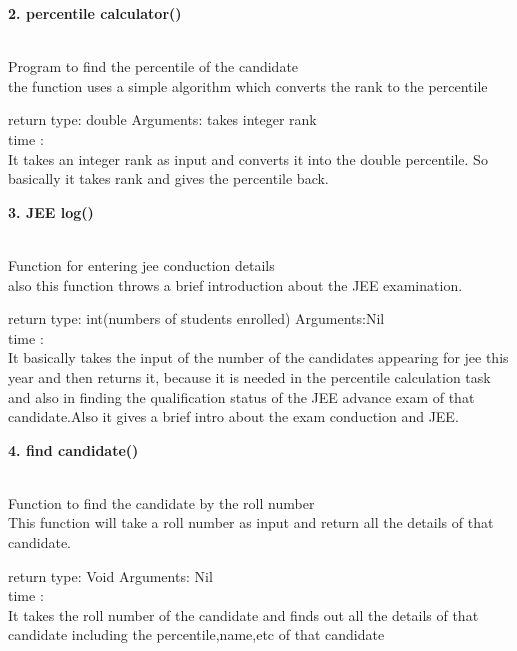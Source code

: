 \documentclass{article}
\begin{document}
 \vspace{5mm}
{\Large \textbf{2. percentile calculator()}} \\
\\
{\large Program to find the percentile of the candidate\\
the function uses a simple algorithm which converts the rank to the percentile\
 \vspace{5mm}

return type: double  \hspace{5mm}  Arguments: takes integer rank\\
   time :\\
It takes an integer rank as input and converts it into the double percentile.
So basically it takes rank and gives the percentile back.
 }
 
  \vspace{5mm}
{\Large \textbf{3. JEE log()}} \\
\\
{\large Function for entering jee conduction details\\
also this function throws a brief introduction about the JEE examination.\\
 \vspace{5mm}

return type: int(numbers of students enrolled)  \hspace{5mm}  Arguments:Nil\\
   time :\\
It basically takes the input of the number of the candidates appearing for jee this year and then returns it, because it is needed in the percentile calculation task and also in finding the qualification status of the JEE advance exam of that candidate.Also it gives a brief intro about the exam conduction and JEE.
 }
 
   \vspace{5mm}
{\Large \textbf{4. find candidate()}} \\
\\
{\large Function to find the candidate by the roll number\\
This function will take a roll number as input and return all the details of that candidate.
 \vspace{5mm}

return type: Void  \hspace{5mm}  Arguments: Nil\\
   time :\\
It takes the roll number of the candidate and finds out all the details of that candidate including the percentile,name,etc of that candidate
 }
 
\end{document}
